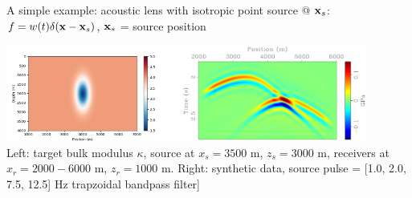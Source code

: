 \documentclass[xcolor=dvipsnames,12pt,aspectratio=169]{beamer}
\begin{document}
\begin{frame}
A simple example: acoustic lens with isotropic point source @ $\mathbf{x}_s$:
$f = w(t)\delta(\mathbf{x}-\mathbf{x}_s)$, $\mathbf{x}_s$ = source position\\
\vspace{-0.25in}
\begin{center}
\vspace{0.25in}
\includegraphics[height=1.25in]{Fig/bml0.png}\includegraphics[height=1.25in]{Fig/ptpwindl0.pdf}\\
\vspace{0.5cm} Left: target bulk modulus $\kappa$, source at
$x_s=3500$ m, $z_s=3000$ m, receivers at $x_r=2000-6000$ m, $z_r=1000$
m. Right: synthetic data, source pulse = [1.0, 2.0, 7.5, 12.5] Hz trapzoidal bandpass filter]
\end{center}
\end{frame}

\end{document}
